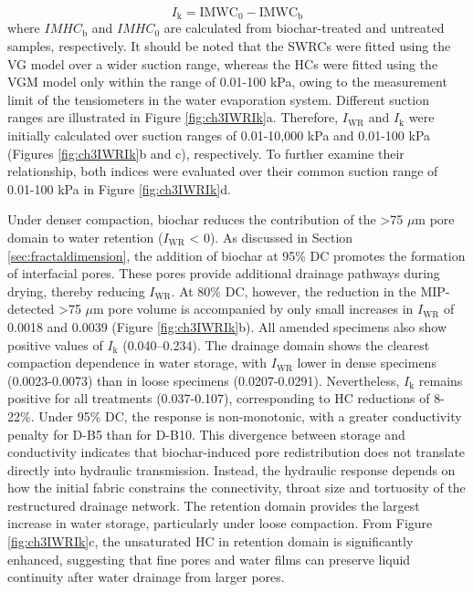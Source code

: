 \begin{equation}
    I_\mathrm{k} = \mathrm{IMWC}_\mathrm{0} - \mathrm{IMWC}_\mathrm{b}
\end{equation}
where $IMHC_\mathrm{b}$ and $IMHC_0$ are calculated from biochar-treated and untreated samples, respectively. It should be noted that the \acp{SWRC} were fitted using the VG model over a wider suction range, whereas the \acp{HC} were fitted using the VGM model only within the range of 0.01-100 kPa, owing to the measurement limit of the tensiometers in the water evaporation system. Different suction ranges are illustrated in Figure \ref{fig:ch3IWRIk}a. Therefore, $I_\mathrm{WR}$ and $I_\mathrm{k}$ were initially calculated over suction ranges of 0.01-10,000 kPa and 0.01-100 kPa (Figures \ref{fig:ch3IWRIk}b and c), respectively. To further examine their relationship, both indices were evaluated over their common suction range of 0.01-100 kPa in Figure \ref{fig:ch3IWRIk}d.\par
Under denser compaction, biochar reduces the contribution of the >75 $\mu$m pore domain to water retention ($I_\mathrm{WR}$ < 0). As discussed in Section \ref{sec:fractaldimension}, the addition of biochar at 95\% \ac{DC} promotes the formation of interfacial pores. These pores provide additional drainage pathways during drying, thereby reducing $I_\mathrm{WR}$. At 80\% \ac{DC}, however, the reduction in the \ac{MIP}-detected >75 $\mu$m pore volume is accompanied by only small increases in $I_\mathrm{WR}$ of 0.0018 and 0.0039 (Figure \ref{fig:ch3IWRIk}b). All amended specimens also show positive values of $I_\mathrm{k}$ (0.040–0.234). The drainage domain shows the clearest compaction dependence in water storage, with $I_\mathrm{WR}$ lower in dense specimens (0.0023-0.0073) than in loose specimens (0.0207-0.0291). Nevertheless, $I_\mathrm{k}$ remains positive for all treatments (0.037-0.107), corresponding to \ac{HC} reductions of 8-22\%. Under 95\% \ac{DC}, the response is non-monotonic, with a greater conductivity penalty for D-B5 than for D-B10. This divergence between storage and conductivity indicates that biochar-induced pore redistribution does not translate directly into hydraulic transmission. Instead, the hydraulic response depends on how the initial fabric constrains the connectivity, throat size and tortuosity of the restructured drainage network. The retention domain provides the largest increase in water storage, particularly under loose compaction. From Figure \ref{fig:ch3IWRIk}c, the unsaturated \ac{HC} in retention domain is significantly enhanced, suggesting that fine pores and water films can preserve liquid continuity after water drainage from larger pores.\par
